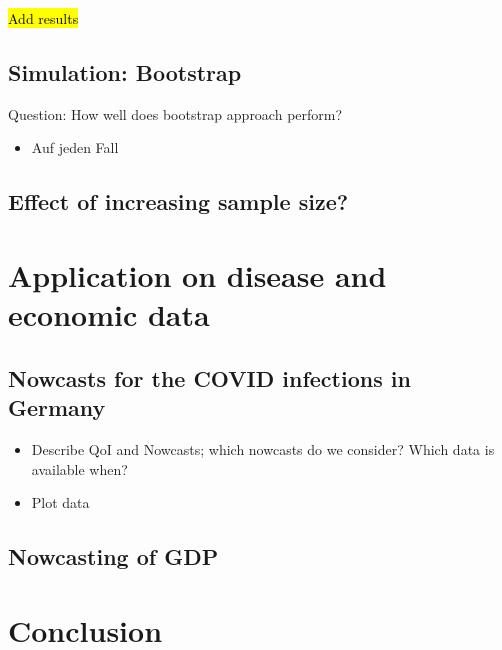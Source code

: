 \documentclass[oneside]{article}
\theoremstyle{plain}%
\theoremstyle{definition}
\begin{document}
\hl{Add results}

\subsection{Simulation: Bootstrap}

Question: How well does bootstrap approach perform?

\begin{itemize}
  \item Auf jeden Fall
\end{itemize}

\subsection{Effect of increasing sample size?}

\section{Application on disease and economic data}

\subsection{Nowcasts for the COVID infections in Germany}

\begin{itemize}
  \item Describe QoI and Nowcasts; which nowcasts do we consider? Which data is available when?
  \item Plot data
\end{itemize}

\subsection{Nowcasting of GDP}

\section{Conclusion}
\end{document}
